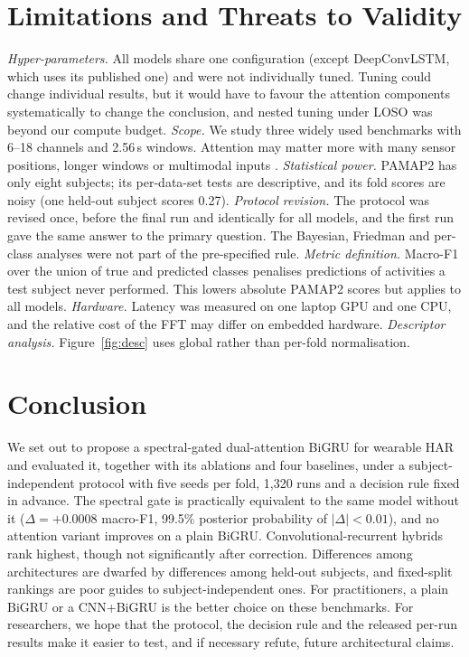 \documentclass[11pt,a4paper]{article}
\begin{document}
\section{Limitations and Threats to Validity}
\label{sec:limits}
\emph{Hyper-parameters.} All models share one configuration (except DeepConvLSTM, which uses its published one) and were not individually tuned. Tuning could change individual results, but it would have to favour the attention components systematically to change the conclusion, and nested tuning under LOSO was beyond our compute budget.
\emph{Scope.} We study three widely used benchmarks with 6--18 channels and 2.56\,s windows. Attention may matter more with many sensor positions, longer windows or multimodal inputs \cite{ma2019attnsense}.
\emph{Statistical power.} PAMAP2 has only eight subjects; its per-data-set tests are descriptive, and its fold scores are noisy (one held-out subject scores 0.27).
\emph{Protocol revision.} The protocol was revised once, before the final run and identically for all models, and the first run gave the same answer to the primary question. The Bayesian, Friedman and per-class analyses were not part of the pre-specified rule.
\emph{Metric definition.} Macro-F1 over the union of true and predicted classes penalises predictions of activities a test subject never performed. This lowers absolute PAMAP2 scores but applies to all models.
\emph{Hardware.} Latency was measured on one laptop GPU and one CPU, and the relative cost of the FFT may differ on embedded hardware.
\emph{Descriptor analysis.} Figure~\ref{fig:desc} uses global rather than per-fold normalisation.

\section{Conclusion}
We set out to propose a spectral-gated dual-attention BiGRU for wearable HAR and evaluated it, together with its ablations and four baselines, under a subject-independent protocol with five seeds per fold, 1{,}320 runs and a decision rule fixed in advance. The spectral gate is practically equivalent to the same model without it ($\Delta=+0.0008$ macro-F1, 99.5\% posterior probability of $|\Delta|<0.01$), and no attention variant improves on a plain BiGRU. Convolutional-recurrent hybrids rank highest, though not significantly after correction. Differences among architectures are dwarfed by differences among held-out subjects, and fixed-split rankings are poor guides to subject-independent ones. For practitioners, a plain BiGRU or a CNN+BiGRU is the better choice on these benchmarks. For researchers, we hope that the protocol, the decision rule and the released per-run results make it easier to test, and if necessary refute, future architectural claims.
\end{document}

